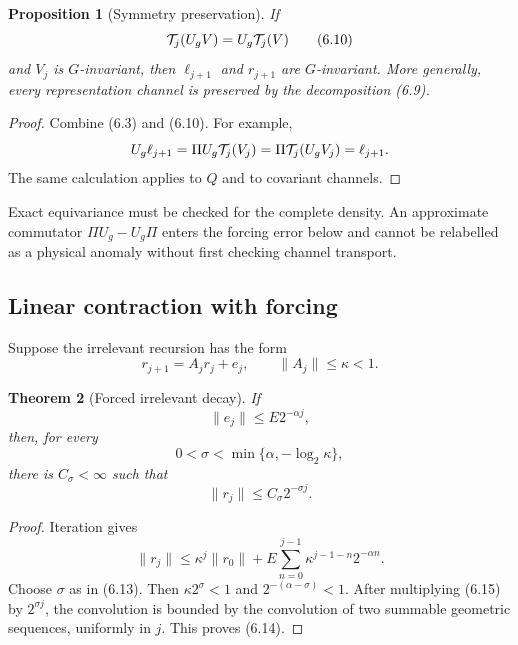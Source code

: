 \documentclass[11pt]{article}
\newtheorem{theorem}{Theorem}[section]
\newtheorem{proposition}[theorem]{Proposition}
\theoremstyle{remark}
\begin{document}
\begin{proposition}[Symmetry preservation]
\label{prop:v12v6-symmetry}
If
\[
                        {\cal T}_j(U_gV)=U_g{\cal T}_j(V)    \tag{6.10}
\]
and \(V_j\) is \(G\)-invariant, then \(\ell_{j+1}\) and
\(r_{j+1}\) are \(G\)-invariant.  More generally, every
representation channel is preserved by the decomposition (6.9).
\end{proposition}

\begin{proof}
Combine (6.3) and (6.10).  For example,
\[
 U_g\ell_{j+1}
 =\Pi U_g{\cal T}_j(V_j)
 =\Pi{\cal T}_j(U_gV_j)=\ell_{j+1}.
\]
The same calculation applies to \(Q\) and to covariant channels.
\end{proof}

Exact equivariance must be checked for the complete density.  An
approximate commutator \(\Pi U_g-U_g\Pi\) enters the forcing error
below and cannot be relabelled as a physical anomaly without first
checking channel transport.

\subsection{Linear contraction with forcing}

Suppose the irrelevant recursion has the form
\[
                              r_{j+1}=A_jr_j+e_j,\qquad
                              \|A_j\|\le\kappa<1.             \tag{6.11}
\]

\begin{theorem}[Forced irrelevant decay]
\label{thm:v12v6-linear}
If
\[
                              \|e_j\|\le E2^{-\alpha j},     \tag{6.12}
\]
then, for every
\[
                              0<\sigma<
                   \min\{\alpha,-\log_2\kappa\},             \tag{6.13}
\]
there is \(C_\sigma<\infty\) such that
\[
                              \|r_j\|\le C_\sigma2^{-\sigma j}.
                                                                    \tag{6.14}
\]
\end{theorem}

\begin{proof}
Iteration gives
\[
 \|r_j\|
 \le\kappa^j\|r_0\|
       +E\sum_{n=0}^{j-1}\kappa^{j-1-n}2^{-\alpha n}.       \tag{6.15}
\]
Choose \(\sigma\) as in (6.13).  Then
\(\kappa2^\sigma<1\) and \(2^{-(\alpha-\sigma)}<1\).
After multiplying (6.15) by \(2^{\sigma j}\), the convolution is
bounded by the convolution of two summable geometric sequences,
uniformly in \(j\).  This proves (6.14).
\end{proof}
\end{document}
